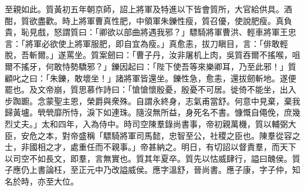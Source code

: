 \begin{pinyinscope}
至親如此。質黃初五年朝京師，詔上將軍及特進以下皆會質所，大官給供具。酒酣，質欲盡歡。時上將軍曹真性肥，中領軍朱鑠性瘦，質召優，使說肥瘦。真負貴，恥見戲，怒謂質曰：「卿欲以部曲將遇我邪？」驃騎將軍曹洪、輕車將軍王忠言：「將軍必欲使上將軍服肥，即自宜為瘦。」真愈恚，拔刀瞋目，言：「俳敢輕脫，吾斬爾。」遂罵坐。質案劒曰：「曹子丹，汝非屠机上肉，吳質吞爾不搖喉，咀爾不搖牙，何敢恃勢驕邪？」鑠因起曰：「陛下使吾等來樂卿耳，乃至此邪！」質顧叱之曰：「朱鑠，敢壞坐！」諸將軍皆還坐。鑠性急，愈恚，還拔劒斬地。遂便罷也。及文帝崩，質思慕作詩曰：「愴愴懷殷憂，殷憂不可居。徙倚不能坐，出入步踟躕。念蒙聖主恩，榮爵與衆殊。自謂永終身，志氣甫當舒。何意中見棄，棄我歸黃壚。煢煢靡所恃，淚下如連珠。隨沒無所益，身死名不書。慷慨自僶俛，庶幾烈丈夫。」太和四年，入為侍中。時司空陳羣錄尚書事，帝初親萬機，質以輔弼大臣，安危之本，對帝盛稱「驃騎將軍司馬懿，忠智至公，社稷之臣也。陳羣從容之士，非國相之才，處重任而不親事。」帝甚納之。明日，有切詔以督責羣，而天下以司空不如長文，即羣，言無實也。質其年夏卒。質先以怙威肆行，謚曰醜侯。質子應仍上書論枉，至正元中乃改謚威侯。應字溫舒，晉尚書。應子康，字子仲，知名於時，亦至大位。


\end{pinyinscope}